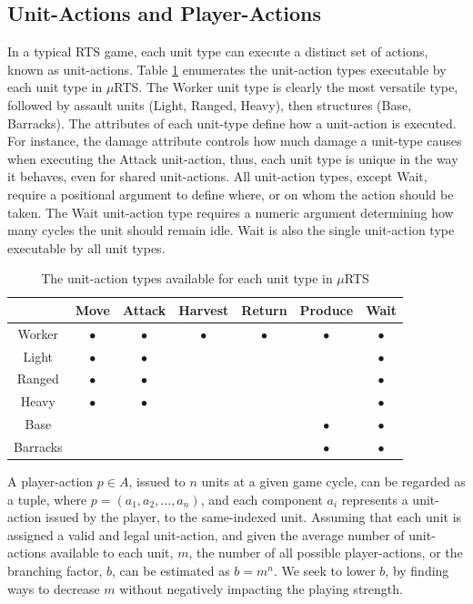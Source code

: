 \documentclass[conference]{IEEEtran}
\newcommand{\mRTS}{$\mu$RTS}
\begin{document}
\subsection{Unit-Actions and Player-Actions}

In a typical RTS game, each unit type can execute a distinct set of actions, known as unit-actions. Table \ref{unitActionsTable} enumerates the unit-action types executable by each unit type in \mRTS{}. The Worker unit type is clearly the most versatile type, followed by assault units (Light, Ranged, Heavy), then structures (Base, Barracks). The attributes of each unit-type define how a unit-action is executed. For instance, the damage attribute controls how much damage a unit-type causes when executing the Attack unit-action, thus, each unit type is unique in the way it behaves, even for shared unit-actions. All unit-action types, except Wait, require a positional argument to define where, or on whom the action should be taken. The Wait unit-action type requires a numeric argument determining how many cycles the unit should remain idle. Wait is also the single unit-action type executable by all unit types.

\begin{table}[!h]
\renewcommand{\arraystretch}{1.3}
\caption{The unit-action types available for each unit type in \mRTS{}}
\label{unitActionsTable}
\centering
\begin{tabular}{c|c|c|c|c|c|c}
\cline{2-7}
\multicolumn{1}{c|}{} & Move & Attack & Harvest & Return & Produce & Wait \\
\hline \hline
Worker   & $\bullet$ & $\bullet$ & $\bullet$ & $\bullet$ & $\bullet$ & $\bullet$ \\
Light    & $\bullet$ & $\bullet$ & & & & $\bullet$ \\
Ranged   & $\bullet$ & $\bullet$ & & & & $\bullet$ \\
Heavy    & $\bullet$ & $\bullet$ & & & & $\bullet$ \\
Base     & & & & & $\bullet$ & $\bullet$ \\
Barracks & & & & & $\bullet$ & $\bullet$ \\
\hline
\end{tabular}
\end{table}

A player-action $p \in A$, issued to $n$ units at a given game cycle, can be regarded as a tuple, where $p = (a_1, a_2, \dots, a_n)$, and each component $a_i$ represents a unit-action issued by the player, to the same-indexed unit. Assuming that each unit is assigned a valid and legal unit-action, and given the average number of unit-actions available to each unit, $m$, the number of all possible player-actions, or the branching factor, $b$, can be estimated as $b = m^n$. We seek to lower $b$, by finding ways to decrease $m$ without negatively impacting the playing strength.
\end{document}
